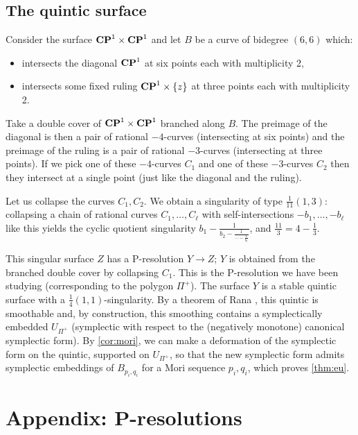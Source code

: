 \documentclass{article}
\begin{document}
\subsection{The quintic surface}


Consider the surface \(\mathbf{CP}^{1}\times\mathbf{CP}^{1}\) and let \(B\) be a curve
of bidegree \((6,6)\) which:
\begin{itemize}
\item intersects the diagonal \(\mathbf{CP}^{1}\) at six points each with
multiplicity 2,
\item intersects some fixed ruling \(\mathbf{CP}^{1}\times\{z\}\) at three points
each with multiplicity 2.
\end{itemize}
Take a double cover of \(\mathbf{CP}^{1}\times\mathbf{CP}^{1}\) branched along
\(B\). The preimage of the diagonal is then a pair of rational
\(-4\)-curves (intersecting at six points) and the preimage of the
ruling is a pair of rational \(-3\)-curves (intersecting at three
points). If we pick one of these \(-4\)-curves \(C_1\) and one of
these \(-3\)-curves \(C_2\) then they intersect at a single point
(just like the diagonal and the ruling).


Let us collapse the curves \(C_1,C_2\). We obtain a singularity of
type \(\frac{1}{11}(1,3)\): collapsing a chain of rational curves
\(C_1,\ldots,C_\ell\) with self-intersections \(-b_1,\ldots,-b_\ell\)
like this yields the cyclic quotient singularity
\(b_1-\frac{1}{b_2-\frac{1}{\cdots-\frac{1}{b_\ell}}}\), and
\(\frac{11}{3}=4-\frac{1}{3}\).


This singular surface \(Z\) has a P-resolution \(Y\to Z\); \(Y\) is
obtained from the branched double cover by collapsing \(C_1\). This is
the P-resolution we have been studying (corresponding to the polygon
\(\Pi^+\)). The surface \(Y\) is a stable quintic surface with a
\(\frac{1}{4}(1,1)\)-singularity. By a theorem of Rana {\cite[Theorem
4.10]{Rana}}, this quintic is smoothable and, by construction, this
smoothing contains a symplectically embedded \(U_{\Pi^+}\) (symplectic
with respect to the (negatively monotone) canonical symplectic
form). By \cref{cor:mori}, we can make a deformation of the symplectic
form on the quintic, supported on \(U_{\Pi^+}\), so that the new
symplectic form admits symplectic embeddings of \(B_{p_i,q_i}\) for a
Mori sequence \(p_i,q_i\), which proves \cref{thm:eu}.




\appendix
\section{Appendix: P-resolutions}
\label{app:pres}
\end{document}
